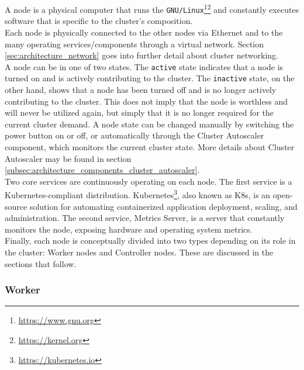 A node is a physical computer that runs the \texttt{GNU/Linux}\footnote{\url{https://www.gnu.org}}\footnote{\url{https://kernel.org}}
and constantly executes software that is specific to the cluster's composition.
\\ %
Each node is physically connected to the other nodes via Ethernet and to the many
operating services/components through a virtual network. Section
\ref{sec:architecture_network} goes into further detail about cluster networking.
\\ %
A node can be in one of two states. The \texttt{active} state indicates that a
node is turned on and is actively contributing to the cluster. The \texttt{inactive}
state, on the other hand, shows that a node has been turned off and is no longer
actively contributing to the cluster. This does not imply that the node is worthless
and will never be utilized again, but simply that it is no longer required for
the current cluster demand. A node state can be changed manually by switching the
power button on or off, or automatically through the Cluster Autoscaler
component, which monitors the current cluster state. More details about Cluster
Autoscaler may be found in section
\ref{subsec:architecture_components_cluster_autoscaler}. \\ %
Two core services are continuously operating on each node. The first service is a
Kubernetes-compliant distribution. Kubernetes\footnote{\url{https://kubernetes.io}},
also known as K8s, is an open-source solution for automating containerized
application deployment, scaling, and administration\cite{k8s}. The second
service, Metrics Server, is a server that constantly monitors the node, exposing
hardware and operating system metrics. \\ %
Finally, each node is conceptually divided into two types depending on its role
in the cluster: Worker nodes and Controller nodes. These are discussed in the
sections that follow.

\subsubsection{Worker}
\label{subsubsec:architecture_components_node_worker}


